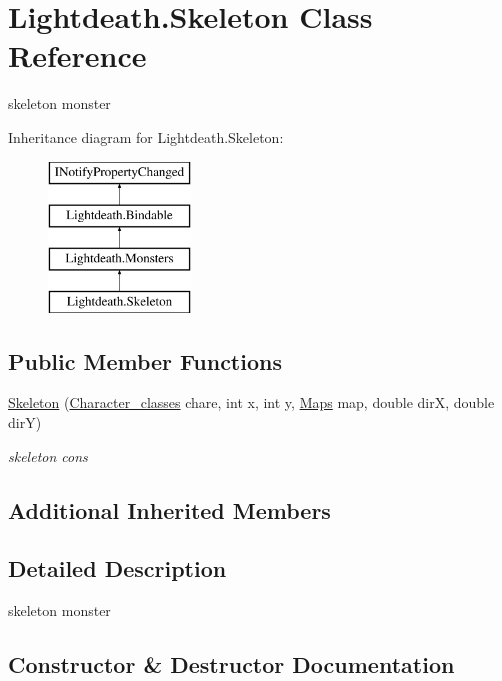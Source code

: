 \hypertarget{class_lightdeath_1_1_skeleton}{}\section{Lightdeath.\+Skeleton Class Reference}
\label{class_lightdeath_1_1_skeleton}


skeleton monster  


Inheritance diagram for Lightdeath.\+Skeleton\+:\begin{figure}[H]
\begin{center}
\leavevmode
\includegraphics[height=4.000000cm]{class_lightdeath_1_1_skeleton}
\end{center}
\end{figure}
\subsection*{Public Member Functions}
\begin{DoxyCompactItemize}
\item 
\hyperlink{class_lightdeath_1_1_skeleton_a331f7eb0e9f53ac013afa83cf22b5986}{Skeleton} (\hyperlink{class_lightdeath_1_1_character__classes}{Character\+\_\+classes} chare, int x, int y, \hyperlink{class_lightdeath_1_1_maps}{Maps} map, double dirX, double dirY)
\begin{DoxyCompactList}\small\item\em skeleton cons \end{DoxyCompactList}\end{DoxyCompactItemize}
\subsection*{Additional Inherited Members}


\subsection{Detailed Description}
skeleton monster 



\subsection{Constructor \& Destructor Documentation}
\hypertarget{class_lightdeath_1_1_skeleton_a331f7eb0e9f53ac013afa83cf22b5986}{}\label{class_lightdeath_1_1_skeleton_a331f7eb0e9f53ac013afa83cf22b5986} 
